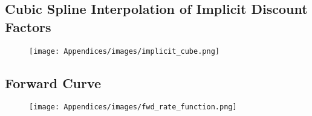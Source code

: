 \FloatBarrier

\newpage

\subsection{Cubic Spline Interpolation of Implicit Discount Factors}

\begin{figure}[ht]
\begin{center}
\texttt{[image: Appendices/images/implicit\_cube.png]}
\end{center}
\end{figure}

\FloatBarrier

\subsection{Forward Curve}

\begin{figure}[ht]
\begin{center}
\texttt{[image: Appendices/images/fwd\_rate\_function.png]}
\end{center}
\end{figure}